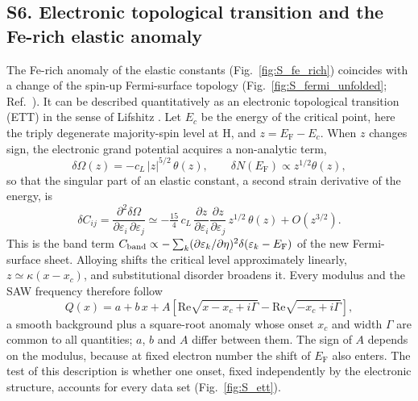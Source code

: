 \documentclass[final,3p,times]{elsarticle}
\begin{document}
\subsection*{S6. Electronic topological transition and the Fe-rich elastic anomaly}
The Fe-rich anomaly of the elastic constants (Fig.~\ref{fig:S_fe_rich}) coincides with a change of the spin-up Fermi-surface topology (Fig.~\ref{fig:S_fermi_unfolded}; Ref.~\cite{korzhavyi2009electronic}). It can be described quantitatively as an electronic topological transition (ETT) in the sense of Lifshitz \cite{lifshitz1960anomalies,varlamov1989kinetic}. Let $E_c$ be the energy of the critical point, here the triply degenerate majority-spin level at H, and $z=E_{\mathrm F}-E_c$. When $z$ changes sign, the electronic grand potential acquires a non-analytic term,
\begin{equation}
\delta\Omega(z) = -c_L\,|z|^{5/2}\,\theta(z), \qquad \delta N(E_{\mathrm F}) \propto z^{1/2}\theta(z),
\label{eq:ett_omega}
\end{equation}
so that the singular part of an elastic constant, a second strain derivative of the energy, is
\begin{equation}
\delta C_{ij} = \frac{\partial^2 \delta\Omega}{\partial\varepsilon_i\,\partial\varepsilon_j} \simeq -\tfrac{15}{4}\,c_L\,\frac{\partial z}{\partial\varepsilon_i}\frac{\partial z}{\partial\varepsilon_j}\, z^{1/2}\,\theta(z) + O\!\left(z^{3/2}\right).
\label{eq:ett_c}
\end{equation}
This is the band term $C_{\rm band}\propto-\sum_k(\partial\varepsilon_k/\partial\eta)^2\delta(\varepsilon_k-E_{\mathrm F})$ of the new Fermi-surface sheet. Alloying shifts the critical level approximately linearly, $z\simeq\kappa(x-x_c)$, and substitutional disorder broadens it. Every modulus and the SAW frequency therefore follow
\begin{equation}
Q(x) = a + b\,x + A\left[\mathrm{Re}\sqrt{x-x_c+i\Gamma}-\mathrm{Re}\sqrt{-x_c+i\Gamma}\right],
\label{eq:ett_fit}
\end{equation}
a smooth background plus a square-root anomaly whose onset $x_c$ and width $\Gamma$ are common to all quantities; $a$, $b$ and $A$ differ between them. The sign of $A$ depends on the modulus, because at fixed electron number the shift of $E_{\mathrm F}$ also enters. The test of this description is whether one onset, fixed independently by the electronic structure, accounts for every data set (Fig.~\ref{fig:S_ett}).
\end{document}
